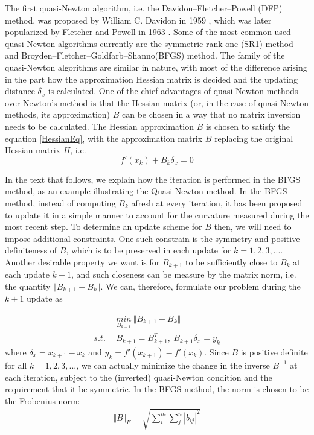 The first quasi-Newton algorithm, i.e. the Davidon–Fletcher–Powell (DFP) method, was proposed by William C. Davidon in 1959 \cite{WilDav59}, which was later popularized by Fletcher and Powell in 1963 \cite{FlePow63}. Some of the most common used quasi-Newton algorithms currently are the symmetric rank-one (SR1) method \cite{ANP91} and Broyden–Fletcher–Goldfarb–Shanno(BFGS) method. The family of the quasi-Newton algorithms are similar in nature, with most of the difference arising in the part how the approximation Hessian matrix is decided and the updating distance $\delta_x $ is calculated. One of the chief advantages of quasi-Newton methods over Newton's method is that the Hessian matrix (or, in the case of quasi-Newton methods, its approximation) $B$ can be chosen in a way that no matrix inversion needs to be calculated. The Hessian approximation $B$ is chosen to satisfy the equation \ref{HessianEq}, with the approximation matrix $B$ replacing the original Hessian matrix $H$, i.e. 
\begin{equation}
	f'(x_k) +B_k\delta_x =0
	\label{HessianAppro}
\end{equation}

In the text that follows, we explain how the iteration is performed in the BFGS method, as an example illustrating the Quasi-Newton method. In the BFGS method, instead of computing $B_k$ afresh at every iteration, it has been proposed to update it in a simple manner to account for the curvature measured during the most recent step. To determine an update scheme for $B$ then, we will need to impose additional constraints. One such constrain is the symmetry and positive-definiteness of $B$, which is to be preserved in each update for $k = 1,2, 3, ...$. Another desirable property we want is for $B_{k+1}$ to be sufficiently close to $B_k$ at each update $k+1$, and such closeness can be measure by the matrix norm, i.e. the quantity $\Vert B_{k+1} - B_{k} \Vert$. We can, therefore, formulate our problem during the $k+1$ update as 

\begin{equation}
	\begin{aligned}
		\  \  \ & \underset{B_{k+1}}{min}  \  \Vert B_{k+1} - B_{k} \Vert\\
		s.t.\ \  & B_{k+1}= B_{k+1}^T, \ B_{k+1}\delta_x  = y_k
	\end{aligned}
	\label{BFGS_updateB}
\end{equation}
where $\delta_x = x_{k+1} -x_k$ and $y_k = f'(x_{k+1}) - f'(x_k)$. Since $B$ is positive definite for all $k = 1,2, 3, ...$, we can actually minimize the change in the inverse $B^{-1}$ at each iteration, subject to the (inverted) quasi-Newton condition and the requirement that it be symmetric. In the BFGS method, the norm is chosen to be the Frobenius norm:
\begin{align*}
\Vert B \Vert_F = \sqrt{\sum_{i}^{m} \sum_{j}^{n} |b_{ij}|^2} 
\end{align*}

